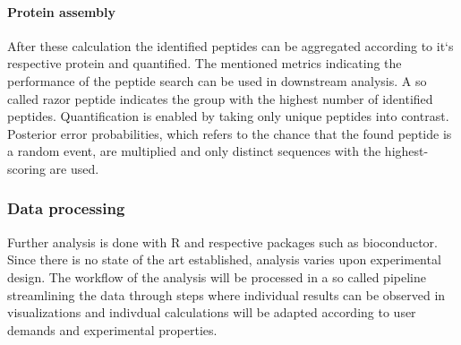 \documentclass[
  11pt,
]{article}
\begin{document}
\hypertarget{protein-assembly}{%
\paragraph{Protein assembly}\label{protein-assembly}}

After these calculation the identified peptides can be aggregated
according to it`s respective protein and quantified. The mentioned
metrics indicating the performance of the peptide search can be used in
downstream analysis. A so called razor peptide indicates the group with
the highest number of identified peptides. Quantification is enabled by
taking only unique peptides into contrast. Posterior error
probabilities, which refers to the chance that the found peptide is a
random event, are multiplied and only distinct sequences with the
highest-scoring are used.

\hypertarget{data-processing}{%
\subsubsection{Data processing}\label{data-processing}}

Further analysis is done with R and respective packages such as
bioconductor. Since there is no state of the art established, analysis
varies upon experimental design. The workflow of the analysis will be
processed in a so called pipeline streamlining the data through steps
where individual results can be observed in visualizations and indivdual
calculations will be adapted according to user demands and experimental
properties.
\end{document}
